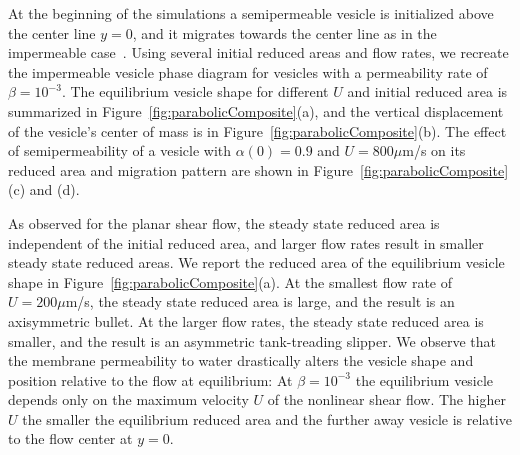 \documentclass[9pt,twocolumn,twoside,lineno]{pnas-new}
\begin{document}
At the beginning of the simulations a semipermeable vesicle is
initialized above the center line $y=0$, and it migrates towards the
center line as in the impermeable case~\cite{dan-vla-mis2009}. 
%
%
%
Using several initial reduced areas and flow rates, we recreate the
impermeable vesicle phase diagram for vesicles with a permeability rate
of $\beta = 10^{-3}$. The equilibrium vesicle shape for different $U$
and initial reduced area is summarized in
Figure~\ref{fig:parabolicComposite}(a), and the vertical displacement of
the vesicle's center of mass is in
Figure~\ref{fig:parabolicComposite}(b). The effect of semipermeability
of a vesicle with $\alpha(0) = 0.9$ and $U=800 \mu$m/s on its reduced
area and migration pattern are shown in
Figure~\ref{fig:parabolicComposite}(c) and (d). 

As observed for the planar shear flow, the steady state reduced area is
independent of the initial reduced area, and larger flow rates result in
smaller steady state reduced areas. We report the reduced area of the
equilibrium vesicle shape in Figure~\ref{fig:parabolicComposite}(a). At
the smallest flow rate of $U= 200 \mu$m/s, the steady state reduced
area is large, and the result is an axisymmetric bullet. At the larger
flow rates, the steady state reduced area is smaller, and the result is
an asymmetric tank-treading slipper. We observe that the membrane
permeability to water drastically alters the vesicle shape and position
relative to the flow at equilibrium: At $\beta=10^{-3}$ the equilibrium
vesicle depends only on the maximum velocity $U$ of the nonlinear shear
flow. The higher $U$ the smaller the equilibrium reduced area and the
further away vesicle is relative to the flow center at $y=0$. 
 
\end{document}
